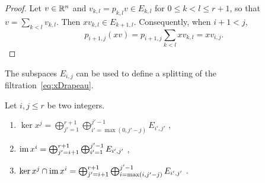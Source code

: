 \documentclass[english]{article}
\begin{document}
\begin{proof}
    Let $v\in\mathbb{R}^n$ and $v_{k,l} = p_{k,l} v \in E_{k,l}$ for $0\leqslant k < l \leqslant r +1$, so that $v = \sum_{k<l} v_{k,l}$.
    Then $x v_{k,l} \in E_{k+1, l}$.
    Consequently, when $i+1 <j$,
\[
    p_{i+1, j}(xv)
        = p_{i+1, j} \sum_{k< l} xv_{k,l} 
        = x v_{i,j}
.\]
\end{proof}
%
The subspaces $E_{i,j}$ can be used to define a splitting of the filtration~\eqref{eq:xDrapeau}.
\begin{lemma}\label{lmno:KerImEij}
    Let $i,j \leqslant r$ be two integers.
    \begin{enumerate}
        \item $\ker x^j
            = \bigoplus_{j'=1}^{r+1}
            \bigoplus_{i'=\max(0, j'-j)}^{j'-1}
                E_{i',j'}$
            ,
        \item $\operatorname{im} x^i
            = \bigoplus_{j'=i+1}^{r+1}
            \bigoplus_{i'=1}^{j'-1}
                E_{i',j'}$
            ,
        \item $\ker x^j \cap \operatorname{im} x^i
            = \bigoplus_{j'=i+1}^{r+1}
            \bigoplus_{i=\max(i, j'-j)}^{j'-1}
                E_{i',j'}$
            .
    \end{enumerate}
\end{lemma}
\end{document}
